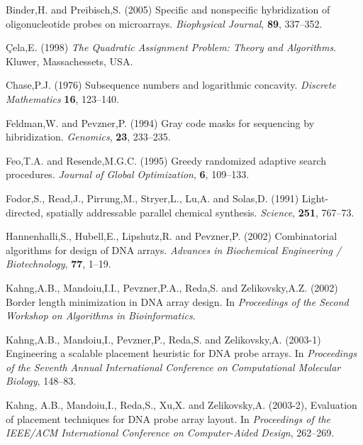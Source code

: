 \documentclass{bioinfo}
\begin{document}
\begin{thebibliography}{}

 Binder,H. and Preibisch,S. (2005) Specific and nonspecific hybridization of oligonucleotide probes on microarrays. {\it Biophysical Journal}, {\bf 89}, 337--352.

 \c{C}ela,E. (1998) {\it The Quadratic Assignment Problem: Theory and Algorithms}. Kluwer, Massachessets, USA.

 Chase,P.J. (1976) Subsequence numbers and logarithmic concavity. {\it Discrete Mathematics} {\bf 16}, 123--140.

 Feldman,W. and Pevzner,P. (1994) Gray code masks for sequencing by hibridization. {\it Genomics}, {\bf 23}, 233--235.

 Feo,T.A. and Resende,M.G.C. (1995) Greedy randomized adaptive search procedures. {\it Journal of Global Optimization}, {\bf 6}, 109--133.

 Fodor,S., Read,J., Pirrung,M., Stryer,L., Lu,A. and Solas,D. (1991) Light-directed, spatially addressable parallel chemical synthesis. {\it Science}, {\bf 251}, 767--73.

 Hannenhalli,S., Hubell,E., Lipshutz,R. and Pevzner,P. (2002) Combinatorial algorithms for design of DNA arrays. {\it Advances in Biochemical Engineering / Biotechnology}, {\bf 77}, 1--19.

 Kahng,A.B., Mandoiu,I.I., Pevzner,P.A., Reda,S. and Zelikovsky,A.Z. (2002) Border length minimization in DNA array design. In {\it Proceedings of the Second Workshop on Algorithms in Bioinformatics}.

 Kahng,A.B., Mandoiu,I., Pevzner,P., Reda,S. and Zelikovsky,A. (2003-1) Engineering a scalable placement heuristic for DNA probe arrays. In {\it Proceedings of the Seventh Annual International Conference on Computational Molecular Biology}, 148--83.

 Kahng, A.B., Mandoiu,I., Reda,S., Xu,X. and Zelikovsky,A. (2003-2), Evaluation of placement techniques for DNA probe array layout. In {\it Proceedings of the IEEE/ACM International Conference on Computer-Aided Design}, 262--269.


\end{thebibliography}
\end{document}
